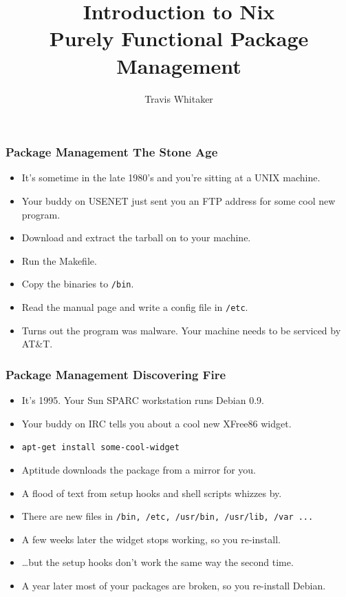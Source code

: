 \documentclass{beamer}
\begin{document}
\title{Introduction to Nix \\ Purely Functional Package Management}
\author{Travis Whitaker}
\date{}

\maketitle

\begin{frame}
\frametitle{Package Management \textemdash The Stone Age}
\begin{itemize}
\item It's sometime in the late 1980's and you're sitting at a UNIX machine.
\item Your buddy on USENET just sent you an FTP address for some cool new program.
\item Download and extract the tarball on to your machine.
\item Run the Makefile.
\item Copy the binaries to \texttt{/bin}.
\item Read the manual page and write a config file in \texttt{/etc}.
\item Turns out the program was malware. Your machine needs to be serviced by AT\&T.
\end{itemize}
\end{frame}

\begin{frame}
\frametitle{Package Management \textemdash Discovering Fire}
\begin{itemize}
\item It's 1995. Your Sun SPARC workstation runs Debian 0.9.
\item Your buddy on IRC tells you about a cool new XFree86 widget.
\item \texttt{apt-get install some-cool-widget}
\item Aptitude downloads the package from a mirror for you.
\item A flood of text from setup hooks and shell scripts whizzes by.
\item There are new files in \texttt{/bin, /etc, /usr/bin, /usr/lib, /var ...}
\item A few weeks later the widget stops working, so you re-install.
\item \ldots but the setup hooks don't work the same way the second time.
\item A year later most of your packages are broken, so you re-install Debian.
\end{itemize}
\end{frame}
\end{document}
